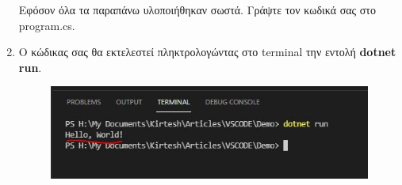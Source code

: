 \begin{enumerate}
    Εφόσον όλα τα παραπάνω υλοποιήθηκαν σωστά. Γράψτε τον κωδικά σας στο program.cs.
    \\[8\baselineskip]

    \item Ο κώδικας σας θα εκτελεστεί πληκτρολογώντας στο terminal την εντολή \textbf{dotnet run}.

    \begin{figure}[ht]
        \centering
        \includegraphics[scale=0.5]{images/instVSC8.jpeg}
    \end{figure}
\end{enumerate}